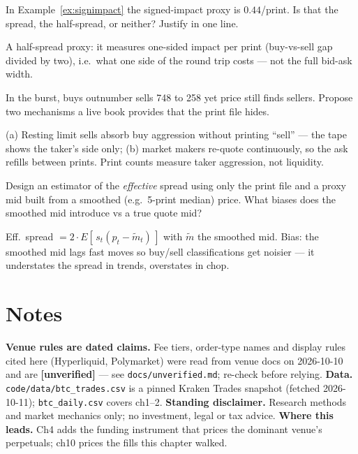 \begin{exercise}[easy]
In Example~\ref{ex:signimpact} the signed-impact proxy is
$0.44$/print. Is that the spread, the half-spread, or neither?
Justify in one line.
\end{exercise}
\begin{solution}
A half-spread proxy: it measures one-sided impact per print
(buy-vs-sell gap divided by two), i.e.\ what one side of the
round trip costs --- not the full bid-ask width.
\end{solution}
\begin{exercise}[medium]
In the burst, buys outnumber sells 748 to 258 yet price still finds
sellers. Propose two mechanisms a live book provides that the print
file hides.
\end{exercise}
\begin{solution}
(a) Resting limit sells absorb buy aggression without printing
``sell'' --- the tape shows the taker's side only; (b) market
makers re-quote continuously, so the ask refills between prints.
Print counts measure taker aggression, not liquidity.
\end{solution}
\begin{exercise}[hard]
Design an estimator of the \emph{effective} spread using only the
print file and a proxy mid built from a smoothed (e.g.\ 5-print
median) price. What biases does the smoothed mid introduce vs a
true quote mid?
\end{exercise}
\begin{solution}
Eff.\ spread $= 2\cdot E[\,s_t(p_t - \tilde m_t)\,]$ with
$\tilde m$ the smoothed mid. Bias: the smoothed mid lags fast moves
so buy/sell classifications get noisier --- it understates the
spread in trends, overstates in chop.
\end{solution}

\section*{Notes}
\textbf{Venue rules are dated claims.} Fee tiers, order-type names
and display rules cited here (Hyperliquid, Polymarket) were read
from venue docs on 2026-10-10 and are \textbf{[unverified]} --- see
\texttt{docs/unverified.md}; re-check before relying.
\textbf{Data.} \texttt{code/data/btc\_trades.csv} is a pinned Kraken
Trades snapshot (fetched 2026-10-11); \texttt{btc\_daily.csv} covers
ch1--2. \textbf{Standing disclaimer.} Research methods and market
mechanics only; no investment, legal or tax advice.
\textbf{Where this leads.} Ch4 adds the funding instrument that
prices the dominant venue's perpetuals; ch10 prices the fills this
chapter walked.

